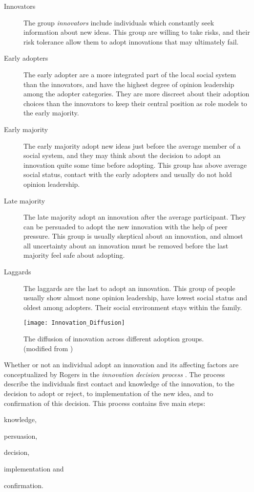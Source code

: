 \begin{description}
  \item[Innovators] The group \textit{innovators} include individuals which constantly seek information about new ideas. This group are willing to take risks, and their risk tolerance allow them to adopt innovations that may ultimately fail.
  \item[Early adopters] The early adopter are a more integrated part of the local social system than the innovators, and have the highest degree of opinion leadership among the adopter categories. They are more discreet about their adoption choices than the innovators to keep their central position as role models to the early majority.
  \item[Early majority] The early majority adopt new ideas just before the average member of a social system, and they may think about the decision to adopt an innovation quite some time before adopting. This group has above average social status, contact with the early adopters and usually do not hold opinion leadership.
  \item[Late majority] The late majority adopt an innovation after the average participant. They can be persuaded to adopt the new innovation with the help of peer pressure. This group is usually skeptical about an innovation, and almost all uncertainty about an innovation must be removed before the last majority feel safe about adopting.
  \item[Laggards] The laggards are the last to adopt an innovation. This group of people usually show almost none opinion leadership, have lowest social status and oldest among adopters. Their social environment stays within the family.
\end{description}

\begin{figure}[h]
  \centering
    \texttt{[image: Innovation\_Diffusion]}
  \caption{The diffusion of innovation across different adoption groups. (modified from \cite{Rogers1983})}
  \label{fig:Innovation_Diffusion}
\end{figure}

Whether or not an individual adopt an innovation and its affecting factors are conceptualized by Rogers in the \textit{innovation decision process} \cite{Rogers1983}. The process describe the individuals first contact and knowledge of the innovation, to the decision to adopt or reject, to implementation of the new idea, and to confirmation of this decision. This process contains five main steps: \begin{enumerate*}[label=(\(\arabic*\))]
  \item knowledge,
  \item persuasion,
  \item decision,
  \item implementation and
  \item confirmation.
\end{enumerate*}

